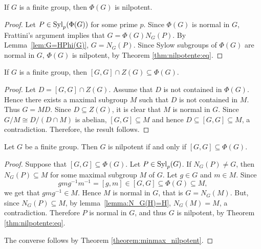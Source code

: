 \begin{theorem}[Frattini]
	\label{theorem:Frattini}
	If $G$ is a finite group, then $\Phi(G)$ is nilpotent. 
\end{theorem}

\begin{proof}
	Let $P\in\mathrm{Syl}_p(\Phi(G))$ for some prime $p$. Since $\Phi(G)$ is normal in
	$G$, Frattini's argument implies that 
	$G=\Phi(G)N_G(P)$. By Lemma~\ref{lem:G=HPhi(G)},
	$G=N_G(P)$. Since Sylow subgroups of $\Phi(G)$ are normal in $G$,
	$\Phi(G)$ is nilpotent, by Theorem \ref{thm:nilpotente:eq}.
\end{proof}



\begin{theorem}
	\label{thm:Gaschutz}
	If $G$ is a finite group, then $[G,G]\cap Z(G)\subseteq\Phi(G)$.
\end{theorem}

\begin{proof}
	Let $D=[G,G]\cap Z(G)$. Assume that $D$ is not contained in $\Phi(G)$.
	Hence there exists a maximal subgroup $M$ 
	such that $D$ is not contained in $M$. Thus $G=MD$. Since $D\subseteq Z(G)$, it is clear that $M$ is normal in $G$.
	Since $G/M\cong D/(D\cap M)$ is abelian,  $[G,G]\subseteq M$ and hence 
	$D\subseteq [G,G]\subseteq M$, a contradiction. Therefore, the result follows.
\end{proof}


\begin{theorem}[Wielandt]
	\label{theorem:Wielandt}
	Let $G$ be a finite group. Then $G$ is nilpotent if and only if
	$[G,G]\subseteq\Phi(G)$.
\end{theorem}

\begin{proof}
	Suppose that $[G,G]\subseteq\Phi(G)$. Let $P\in\mathrm{Syl}_p(G)$. If $N_G(P)\ne
	G$, then $N_G(P)\subseteq M$ for some maximal subgroup $M$ of $G$. Let
	$g\in G$ and $m\in M$. Since 
	\[
		gmg^{-1}m^{-1}=[g,m]\in [G,G]\subseteq\Phi(G)\subseteq M,
	\]
	we get that $gmg^{-1}\in M$. Hence $M$ is normal in $G$, that is $G=N_G(M)$. But, since $N_G(P)\subseteq M$, by
	lemma~\ref{lemma:N_G(H)=H}, $N_G(M)=M$, a contradiction. Therefore $P$ is normal in $G$, and thus $G$ is nilpotent, by Theorem \ref{thm:nilpotente:eq}.
	
	The converse follows by Theorem \ref{theorem:minmax_nilpotent}.
\end{proof}

